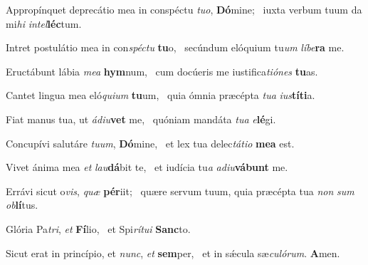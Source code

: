 \item Appropínquet deprecátio mea in conspéctu \textit{tuo}, \textbf{Dó}mine;~\psstar{} iuxta verbum tuum da mi\textit{hi} \textit{intel}\textbf{léc}tum.

\item Intret postulátio mea in con\textit{spéctu} \textbf{tu}o,~\psstar{} secúndum elóquium tu\textit{um} \textit{líbe}\textbf{ra} me.

\item Eructábunt lábia \textit{mea} \textbf{hym}num,~\psstar{} cum docúeris me iustifica\textit{tiónes} \textbf{tu}as.

\item Cantet lingua mea eló\textit{quium} \textbf{tu}um,~\psstar{} quia ómnia præcépta \textit{tua} \textit{ius}\textbf{tí}\textbf{ti}a.

\item Fiat manus tua, ut \textit{ádiu}\textbf{vet} me,~\psstar{} quóniam mandáta \textit{tua} \textit{e}\textbf{lé}gi.

\item Concupívi salutáre \textit{tuum}, \textbf{Dó}mine,~\psstar{} et lex tua delec\textit{tátio} \textbf{me}\textbf{a} est.

\item Vivet ánima mea \textit{et} \textit{lau}\textbf{dá}bit te,~\psstar{} et iudícia tu\textit{a} \textit{adiu}\textbf{vá}\textbf{bunt} me.

\item Errávi sicut o\textit{vis}, \textit{quæ} \textbf{pér}iit;~\psstar{} quære servum tuum, quia præcépta tua \textit{non} \textit{sum} \textit{ob}\textbf{lí}tus.

\item Glória Pa\textit{tri}, \textit{et} \textbf{Fí}lio,~\psstar{} et Spi\textit{rítui} \textbf{Sanc}to.

\item Sicut erat in princípio, et \textit{nunc}, \textit{et} \textbf{sem}per,~\psstar{} et in sǽcula sæ\textit{culórum}. \textbf{A}men.